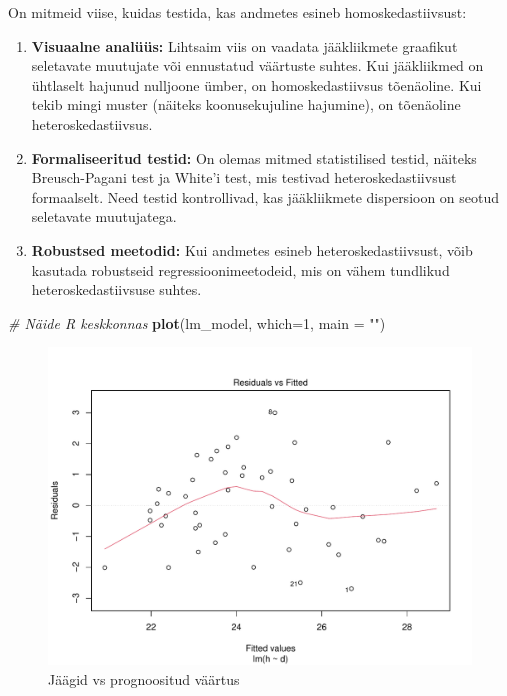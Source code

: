 \documentclass[
]{book}
\newenvironment{Shaded}{\begin{snugshade}}{\end{snugshade}}
\newcommand{\AttributeTok}[1]{\textcolor[rgb]{0.13,0.29,0.53}{#1}}
\newcommand{\CommentTok}[1]{\textcolor[rgb]{0.56,0.35,0.01}{\textit{#1}}}
\newcommand{\DecValTok}[1]{\textcolor[rgb]{0.00,0.00,0.81}{#1}}
\newcommand{\FunctionTok}[1]{\textcolor[rgb]{0.13,0.29,0.53}{\textbf{#1}}}
\newcommand{\NormalTok}[1]{#1}
\newcommand{\StringTok}[1]{\textcolor[rgb]{0.31,0.60,0.02}{#1}}
\providecommand{\tightlist}{%
  \setlength{\itemsep}{0pt}\setlength{\parskip}{0pt}}
\renewenvironment{Shaded} {\begin{snugshade}\footnotesize} {\end{snugshade}}
\begin{document}
On mitmeid viise, kuidas testida, kas andmetes esineb homoskedastiivsust:

\begin{enumerate}
\def\labelenumi{\arabic{enumi}.}
\tightlist
\item
  \textbf{Visuaalne analüüs:} Lihtsaim viis on vaadata jääkliikmete graafikut seletavate muutujate või ennustatud väärtuste suhtes. Kui jääkliikmed on ühtlaselt hajunud nulljoone ümber, on homoskedastiivsus tõenäoline. Kui tekib mingi muster (näiteks koonusekujuline hajumine), on tõenäoline heteroskedastiivsus.
\item
  \textbf{Formaliseeritud testid:} On olemas mitmed statistilised testid, näiteks Breusch-Pagani test ja White'i test, mis testivad heteroskedastiivsust formaalselt. Need testid kontrollivad, kas jääkliikmete dispersioon on seotud seletavate muutujatega.
\item
  \textbf{Robustsed meetodid:} Kui andmetes esineb heteroskedastiivsust, võib kasutada robustseid regressioonimeetodeid, mis on vähem tundlikud heteroskedastiivsuse suhtes.
\end{enumerate}

\begin{Shaded}
\begin{Highlighting}[]
\CommentTok{\# Näide R keskkonnas}
\FunctionTok{plot}\NormalTok{(lm\_model, }\AttributeTok{which=}\DecValTok{1}\NormalTok{, }\AttributeTok{main =} \StringTok{""}\NormalTok{) }
\end{Highlighting}
\end{Shaded}

\begin{figure}
\includegraphics[width=0.8\linewidth]{_main_files/figure-latex/unnamed-chunk-63-1} \caption{Jäägid vs prognoositud väärtus}\label{fig:unnamed-chunk-63}
\end{figure}
\end{document}
